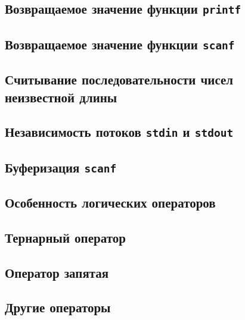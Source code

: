 \documentclass[10pt]{article}
\begin{document}
\subsection*{Возвращаемое значение функции \texttt{printf}}
\subsection*{Возвращаемое значение функции \texttt{scanf}}
\subsection*{Считывание последовательности чисел неизвестной длины}

\subsection*{Независимость потоков \texttt{stdin} и \texttt{stdout}}

\subsection*{Буферизация \texttt{scanf}}

\subsection*{Особенность логических операторов}
\subsection*{Тернарный оператор}
\subsection*{Оператор запятая}
\subsection*{Другие операторы}
\end{document}
